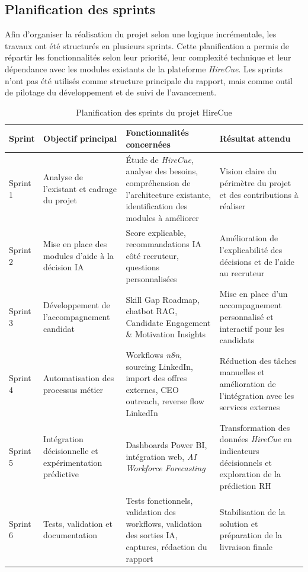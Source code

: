 \subsection{Planification des sprints}

Afin d'organiser la réalisation du projet selon une logique incrémentale, les travaux ont été structurés en plusieurs sprints. Cette planification a permis de répartir les fonctionnalités selon leur priorité, leur complexité technique et leur dépendance avec les modules existants de la plateforme \textit{HireCue}. Les sprints n'ont pas été utilisés comme structure principale du rapport, mais comme outil de pilotage du développement et de suivi de l'avancement.

\begin{table}[H]
\centering
\small
\renewcommand{\arraystretch}{1.25}
\setlength{\tabcolsep}{3pt}
\begin{tabular}{|p{1.6cm}|p{3.2cm}|p{5.4cm}|p{4.3cm}|}
\hline
\rowcolor{TableHeaderBlue}
\textbf{Sprint} & \textbf{Objectif principal} & \textbf{Fonctionnalités concernées} & \textbf{Résultat attendu} \\
\hline
Sprint 1 & Analyse de l'existant et cadrage du projet & Étude de \textit{HireCue}, analyse des besoins, compréhension de l'architecture existante, identification des modules à améliorer & Vision claire du périmètre du projet et des contributions à réaliser \\
\hline
Sprint 2 & Mise en place des modules d'aide à la décision IA & Score explicable, recommandations IA côté recruteur, questions personnalisées & Amélioration de l'explicabilité des décisions et de l'aide au recruteur \\
\hline
Sprint 3 & Développement de l'accompagnement candidat & Skill Gap Roadmap, chatbot RAG, Candidate Engagement \& Motivation Insights & Mise en place d'un accompagnement personnalisé et interactif pour les candidats \\
\hline
Sprint 4 & Automatisation des processus métier & Workflows \textit{n8n}, sourcing LinkedIn, import des offres externes, CEO outreach, reverse flow LinkedIn & Réduction des tâches manuelles et amélioration de l'intégration avec les services externes \\
\hline
Sprint 5 & Intégration décisionnelle et expérimentation prédictive & Dashboards Power BI, intégration web, \textit{AI Workforce Forecasting} & Transformation des données \textit{HireCue} en indicateurs décisionnels et exploration de la prédiction RH \\
\hline
Sprint 6 & Tests, validation et documentation & Tests fonctionnels, validation des workflows, validation des sorties IA, captures, rédaction du rapport & Stabilisation de la solution et préparation de la livraison finale \\
\hline
\end{tabular}
\setlength{\tabcolsep}{6pt}
\normalsize
\caption{Planification des sprints du projet HireCue}
\end{table}

